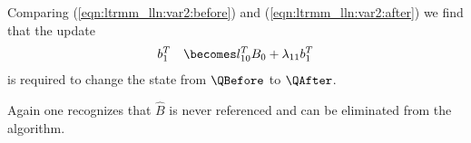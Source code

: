 Comparing 
(\ref{eqn:ltrmm_lln:var2:before}) and
(\ref{eqn:ltrmm_lln:var2:after})
we find that the update
\begin{eqnarray*}
& b_1^T & \becomes l_{10}^T B_{0} + \lambda_{11} b_1^T 
\end{eqnarray*}
is required to change the state from $ \QBefore $
to $ \QAfter $.


Again one recognizes that $ \hat{B} $ is never
referenced and can be eliminated from the algorithm.


\renewcommand{\blocksize}{1}

\renewcommand{\invariant}{
\FlaTwoByOne{ B_T}{B_B} =
\FlaTwoByOne{ \hat{B}_T }
            { L_{BL} \hat{B}_T + L_{BR} \hat{B}_B }
\wedge
\ldots
}

\renewcommand{\guard}{ \neg \SameSize( L, L_{BR} ) }

\renewcommand{\partitionings}{
$ 
B \rightarrow \FlaTwoByOne{ B_{T} }
                          { B_{B} }
$,
$ 
\hat{B} \rightarrow \FlaTwoByOne{ \hat{B}_{T} }
                          { \hat{B}_{B} }
$, and
$ 
L \rightarrow \FlaTwoByTwo{ L_{TL} }{ 0 }
                          { L_{BL} }{ L_{BR} }
$
}
\renewcommand{\partitionsizes}{
$ B_{B} $ and $ \hat{ B }_B $ have $ 0 $ rows
and $ L_{BR} $ is $ 0 \times 0 $
}

\renewcommand{\repartitionings}{
$ 
\FlaTwoByOne{ B_T }{ B_B } 
\rightarrow
\FlaThreeByOneT{ B_0 }{ b_1^T }{ B_2 },
\FlaTwoByOne{ \hat{B}_T }{ \hat{B}_B } 
\rightarrow
\FlaThreeByOneT{ \hat{B}_0 }{ \hat{b}_1^T }{ \hat{B}_2 },
$ \\
and
$ \FlaTwoByTwo{ L_{TL} }{ 0 }
            { L_{BL} }{ L_{BR} }
\rightarrow
\FlaThreeByThreeTL{ L_{00} }{ 0 }{ 0 }
                { l_{10}^T }{ \lambda_{11} }{ 0 }
                { L_{20} }{ l_{21} }{ L_{22} }
$
}
\renewcommand{\repartitionsizes}{
$ b_1^T $ and $ \hat{b}_1^T $ are rows 
and $ \lambda_{11} $ is a scalar
}

\renewcommand{\moveboundaries}{%
$ 
\FlaTwoByOne{ B_T }{ B_B } 
\leftarrow
\FlaThreeByOneB{ B_0 }{ b_1^T }{ B_2 },
\FlaTwoByOne{ \hat{B}_T }{ \hat{B}_B } 
\leftarrow
\FlaThreeByOneB{ \hat{B}_0 }{ \hat{b}_1^T }{ \hat{B}_2 },
$ \\
and
$ \FlaTwoByTwo{ L_{TL} }{ 0 }
            { L_{BL} }{ L_{BR} }
\leftarrow
\FlaThreeByThreeBR{ L_{00} }{ 0 }{ 0 }
                { l_{10}^T }{ \lambda_{11} }{ 0 }
                { L_{20} }{ l_{21} }{ L_{22} }
$
}

